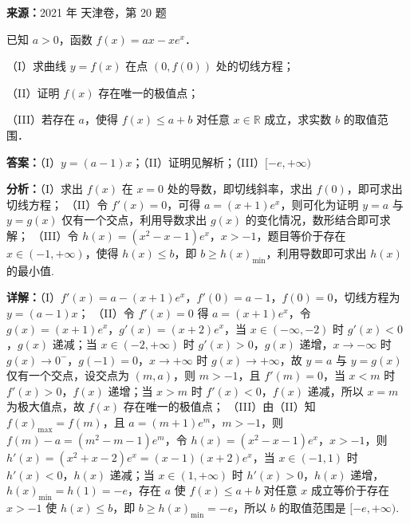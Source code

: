 \begin{question}[points=16]
\textbf{来源：}2021 年 天津卷，第 20 题\par
已知 $a > 0$，函数 $f(x) = ax - xe^x$．

（I）求曲线 $y = f(x)$ 在点 $(0, f(0))$ 处的切线方程；

（II）证明 $f(x)$ 存在唯一的极值点；

（III）若存在 $a$，使得 $f(x) \le a + b$ 对任意 $x \in \mathbb{R}$ 成立，求实数 $b$ 的取值范围．
\begin{solution}
\textbf{答案：}（I）$y = (a-1)x$；（II）证明见解析；（III）$[-e, +\infty)$

\textbf{分析：}（I）求出 $f(x)$ 在 $x=0$ 处的导数，即切线斜率，求出 $f(0)$，即可求出切线方程；
（II）令 $f'(x)=0$，可得 $a = (x+1)e^x$，则可化为证明 $y=a$ 与 $y=g(x)$ 仅有一个交点，利用导数求出 $g(x)$ 的变化情况，数形结合即可求解；
（III）令 $h(x) = (x^2 - x - 1)e^x$，$x > -1$，题目等价于存在 $x \in (-1, +\infty)$，使得 $h(x) \le b$，即 $b \ge h(x)_{\min}$，利用导数即可求出 $h(x)$ 的最小值.

\textbf{详解：}（I）$f'(x) = a - (x+1)e^x$，$f'(0) = a-1$，$f(0)=0$，切线方程为 $y = (a-1)x$；
（II）令 $f'(x)=0$ 得 $a = (x+1)e^x$，令 $g(x) = (x+1)e^x$，$g'(x) = (x+2)e^x$，当 $x \in (-\infty, -2)$ 时 $g'(x)<0$，$g(x)$ 递减；当 $x \in (-2, +\infty)$ 时 $g'(x)>0$，$g(x)$ 递增，$x \to -\infty$ 时 $g(x) \to 0^-$，$g(-1)=0$，$x \to +\infty$ 时 $g(x) \to +\infty$，故 $y=a$ 与 $y=g(x)$ 仅有一个交点，设交点为 $(m, a)$，则 $m > -1$，且 $f'(m)=0$，当 $x < m$ 时 $f'(x)>0$，$f(x)$ 递增；当 $x > m$ 时 $f'(x)<0$，$f(x)$ 递减，所以 $x=m$ 为极大值点，故 $f(x)$ 存在唯一的极值点；
（III）由（II）知 $f(x)_{\max} = f(m)$，且 $a = (m+1)e^m$，$m>-1$，则 $f(m)-a = (m^2 - m -1)e^m$，令 $h(x) = (x^2 - x - 1)e^x$，$x>-1$，则 $h'(x) = (x^2 + x -2)e^x = (x-1)(x+2)e^x$，当 $x \in (-1,1)$ 时 $h'(x)<0$，$h(x)$ 递减；当 $x \in (1, +\infty)$ 时 $h'(x)>0$，$h(x)$ 递增，$h(x)_{\min} = h(1) = -e$，存在 $a$ 使 $f(x) \le a+b$ 对任意 $x$ 成立等价于存在 $x>-1$ 使 $h(x) \le b$，即 $b \ge h(x)_{\min} = -e$，所以 $b$ 的取值范围是 $[-e, +\infty)$.
\end{solution}
\end{question}

